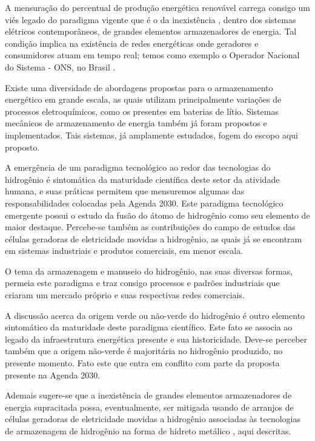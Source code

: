 \documentclass[
   article,       %
   12pt,          %
   oneside,       %
   a4paper,       %
   english,       %
   brazil,           %
   sumario=tradicional
   ]{abntex2}
\begin{document}
A mensuração do percentual de produção energética renovável carrega consigo um viés legado do paradigma vigente que é o da inexistência \cite{OECD_IEA_2012}, dentro dos sistemas elétricos contemporâneos, de grandes elementos armazenadores de energia. Tal condição implica na existência de redes energéticas onde geradores e consumidores atuam em tempo real; temos como exemplo o Operador Nacional do Sistema - ONS, no Brasil \cite{Servicos_Ancilares}.

Existe uma diversidade de abordagens propostas para o armazenamento energético em grande escala, as quais utilizam principalmente variações de processos eletroquímicos, como os presentes em baterias de lítio. Sistemas mecânicos de armazenamento de energia também já foram propostos e implementados. Tais sistemas, já amplamente estudados, fogem do escopo \cite{Energetic_evaluation} aqui proposto.

A emergência de um paradigma tecnológico ao redor das tecnologias do hidrogênio é sintomática da maturidade científica deste setor da atividade humana, e suas práticas permitem que mensuremos algumas das responsabilidades colocadas pela Agenda 2030. Este paradigma tecnológico emergente possui o estudo da fusão do átomo de hidrogênio como seu elemento de maior destaque. Percebe-se também as contribuições do campo de estudos das células geradoras de eletricidade movidas a hidrogênio, as quais já se encontram em sistemas industriais e produtos comerciais, em menor escala.

O tema da armazenagem e manuseio do hidrogênio, nas suas diversas formas, permeia este paradigma e traz consigo processos e padrões industriais que criaram um mercado próprio \cite{hydrogen_markets} e suas respectivas redes comerciais.

A discussão acerca da origem verde ou não-verde \cite{Developments_hydrogen} do hidrogênio é outro elemento sintomático da maturidade deste paradigma científico. Este fato se associa ao legado da infraestrutura energética presente e sua historicidade. Deve-se perceber também que a origem não-verde é majoritária no hidrogênio produzido, no presente momento. Fato este que entra em conflito com parte da proposta presente na Agenda 2030. 

Ademais sugere-se que a inexistência de grandes elementos armazenadores de energia supracitada possa, eventualmente, ser mitigada usando de arranjos de células geradoras de eletricidade movidas a hidrogênio associadas às tecnologias de armazenagem de hidrogênio na forma de hidreto metálico \cite{Comparison_hydrogen_hydrates}, aqui descritas.
\end{document}
